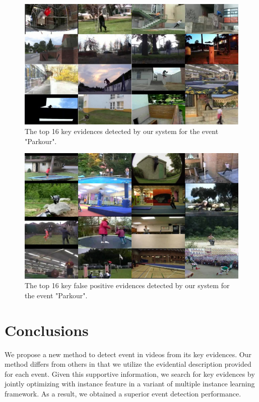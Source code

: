 \begin{figure}
	\centering
	\includegraphics[width=1\textwidth]{parkour.jpg}
	\caption{The top 16 key evidences detected by our system for the event "Parkour".}
	\label{figure_5}
\end{figure}

\begin{figure}
	\centering
	\includegraphics[width=1\textwidth]{parkour_neg.jpg}
	\caption{The top 16 key false positive evidences detected by our system for the event "Parkour".}
	\label{figure_6}
\end{figure}

\section{Conclusions}
\label{conclusion}
We propose a new method to detect event in videos from its key evidences. Our method differs from others in that we utilize the evidential description provided for each event. Given this supportive information, we search for key evidences by jointly optimizing with instance feature in a variant of multiple instance learning framework. As a result, we obtained a superior event detection performance.

